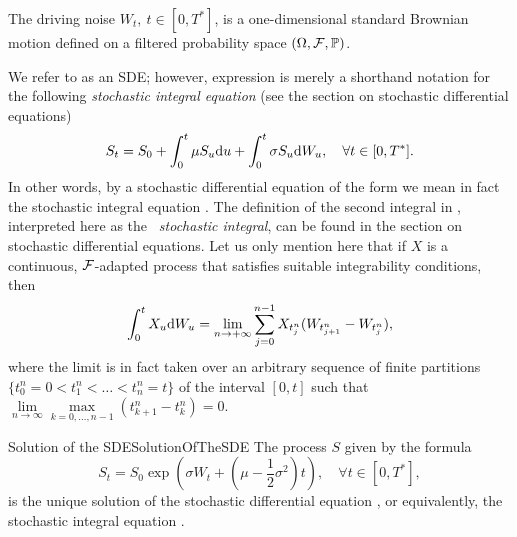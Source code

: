 The driving noise \(W_t, \ t \in [0, T^*]\), is a one-dimensional standard Brownian motion defined on a filtered probability space \((\Omega, \mathcal{F}, \mathbb{P})\).

We refer to  as an SDE; however, expression  is merely a shorthand notation for the following \emph{stochastic integral equation} (see the section on stochastic differential equations)
\begin{equation} \label{eq:StochasticIntegralEquation}
	S_t = S_0 + \int_0^t \mu S_u \mathrm{d} u + \int_0^t \sigma S_u \mathrm{d} W_u, \quad \forall t \in [0, T^*].
\end{equation}
In other words, by a stochastic differential equation of the form  we mean in fact the stochastic integral equation . The definition of the second integral in , interpreted here as the \emph{\Ito\ stochastic integral}, can be found in the section on stochastic differential equations. Let us only mention here that if \(X\) is a continuous, \(\mathcal{F}\)-adapted process that satisfies suitable integrability conditions, then
\begin{equation} \label{eq:ItoIntegralDefinition}
	\int_0^t X_u \mathrm{d} W_u = \lim_{n \to +\infty} \sum_{j=0}^{n-1} X_{t_j^n} (W_{t_{j+1}^n} - W_{t_j^n}),
\end{equation}
where the limit is in fact taken over an arbitrary sequence of finite partitions \(\{t_0^n = 0 < t_1^n < \dots < t_n^n = t\}\) of the interval \([0, t]\) such that \(\lim\limits_{n \to \infty} \max\limits_{k=0, \dots, n-1} (t_{k+1}^n - t_k^n) = 0\).

\begin{prop}{Solution of the SDE}{SolutionOfTheSDE}
	The process \(S\) given by the formula
	\begin{equation} \label{eq:GeometricBrownianMotionExplicit}
		S_t = S_0 \exp \left(\sigma W_t + \left(\mu - \frac{1}{2}\sigma^2\right)t\right), \quad \forall t \in [0, T^*],
	\end{equation}
	is the unique solution of the stochastic differential equation , or equivalently, the stochastic integral equation .
\end{prop}

